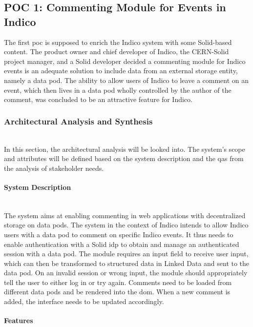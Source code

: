 \subsection{POC 1: Commenting Module for Events in Indico}\label{poc1}

The first \gls{poc} is supposed to enrich the Indico system with some Solid-based content. The product owner and chief developer of Indico, the CERN-Solid project manager, and a Solid developer decided a commenting module for Indico events is an adequate solution to include data from an external storage entity, namely a data pod. The ability to allow users of Indico to leave a comment on an event, which then lives in a data pod wholly controlled by the author of the comment, was concluded to be an attractive feature for Indico.
\vspace{0.5cm}
\subsubsection{Architectural Analysis and Synthesis}\mbox{}\\

In this section, the architectural analysis will be looked into. The system's scope and attributes will be defined based on the system description and the \glspl{qa} from the analysis of stakeholder needs.
\vspace{0.5cm}
\paragraph{System Description}\mbox{}\\

The system aims at enabling commenting in web applications with decentralized storage on data pods. The system in the context of Indico intends to allow Indico users with a data pod to comment on specific Indico events. It thus needs to enable authentication with a Solid \gls{idp} to obtain and manage an authenticated session with a data pod. The module requires an input field to receive user input, which can then be transformed to structured data in Linked Data and sent to the data pod. On an invalid session or wrong input, the module should appropriately tell the user to either log in or try again. Comments need to be loaded from different data pods and be rendered into the \gls{dom}. When a new comment is added, the interface needs to be updated accordingly.
\vspace{0.5cm}
\paragraph{Features}\mbox{}\\

